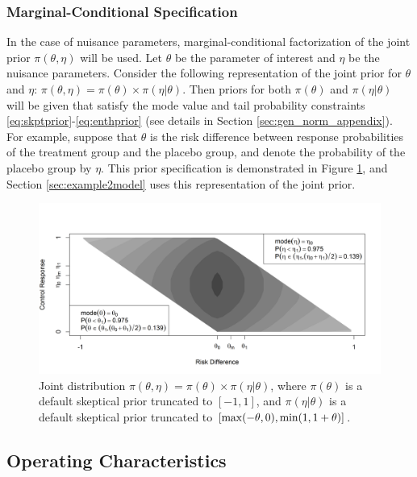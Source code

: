 \documentclass[useAMS,usenatbib,referee]{biom}
\begin{document}
\subsubsection{Marginal-Conditional Specification}\label{sec:cond_marg}
In the case of nuisance parameters, marginal-conditional factorization of the joint prior $\pi(\theta,\eta)$ will be used. Let $\theta$ be the parameter of interest and $\eta$ be the nuisance parameters. Consider the following representation of the joint prior for $\theta$ and $\eta$: $\pi(\theta,\eta)=\pi(\theta)\times\pi(\eta|\theta)$. Then priors for both $\pi(\theta)$ and $\pi(\eta|\theta)$ will be given that satisfy the mode value and tail probability constraints \eqref{eq:skptprior}-\eqref{eq:enthprior} (see details in Section \ref{sec:gen_norm_appendix}). For example, suppose that $\theta$ is the risk difference between response probabilities of the treatment group and the placebo group, and denote the  probability of the placebo group by $\eta$. This prior specification is demonstrated in Figure \ref{fig:figure5}, and Section \ref{sec:example2model} uses this representation of the joint prior.

\begin{figure}\begin{center}
\includegraphics[width=6in]{figure5a.png}
\caption{Joint distribution $\pi(\theta,\eta)=\pi(\theta)\times\pi(\eta|\theta)$, where $\pi(\theta)$ is a default skeptical prior truncated to $[-1,1]$, and $\pi(\eta|\theta)$ is a default skeptical prior truncated to $[{\mathrm{max}}(-\theta,0),{\mathrm{min}}(1,1+\theta)]$.}
\label{fig:figure5}
 \end{center}
\end{figure}

\subsection{Operating Characteristics}
\end{document}
